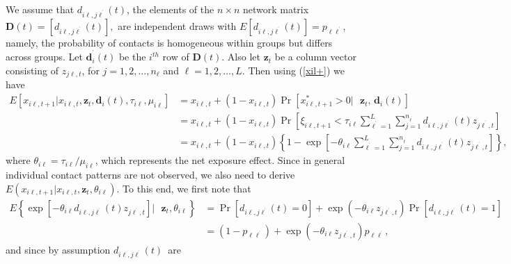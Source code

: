\documentclass[12pt]{article}
\begin{document}
We assume that $d_{i\ell,j\ell^{^{\prime}}}\left(  t\right)  $, the elements
of the $n\times n$ network matrix $\mathbf{D}\left(  t\right)  =\left[
d_{i\ell,j\ell^{^{\prime}}}\left(  t\right)  \right]  ,$ are independent draws
with $E\left[  d_{i\ell,j\ell^{^{\prime}}}\left(  t\right)  \right]
=p_{\ell\ell^{^{\prime}}}$, namely, the probability of contacts is homogeneous
within groups but differs across groups. Let $\boldsymbol{d}_{i}^{^{\prime}%
}\left(  t\right)  $ be the $i^{th}$ row of $\mathbf{D}\left(  t\right)  $.
Also let $\mathbf{z}_{t}$ be a column vector consisting of $z_{j\ell,t}$, for
$j=1,2,\ldots,n_{\ell}$ and $\ell=1,2,\ldots,L$. Then using (\ref{xil+}) we
have
\begin{align*}
E\left[  x_{i\ell,t+1}|x_{i\ell,t},\mathbf{z}_{t},\boldsymbol{d}_{i}\left(
t\right)  ,\tau_{i\ell},\mu_{i\ell}\right]   &  =x_{i\ell,t}+\left(
1-x_{i\ell,t}\right)  \Pr\left[  x_{i\ell,t+1}^{\ast}>0|\text{ }\mathbf{z}%
_{t}\text{, }\boldsymbol{d}_{i}\left(  t\right)  \right] \\
&  =x_{i\ell,t}+\left(  1-x_{i\ell,t}\right)  \Pr\left[  \xi_{i\ell,t+1}%
<\tau_{i\ell}\sum_{\ell^{^{\prime}}=1}^{L}\sum_{j=1}^{n_{\ell^{^{\prime}}}%
}d_{i\ell,j\ell^{^{\prime}}}\left(  t\right)  z_{j\ell^{^{\prime}},t}\right]
\\
&  =x_{i\ell,t}+\left(  1-x_{i\ell,t}\right)  \left\{  1-\exp\left[
-\theta_{i\ell}\sum_{\ell^{^{\prime}}=1}^{L}\sum_{j=1}^{n_{\ell^{^{\prime}}}%
}d_{i\ell,j\ell^{^{\prime}}}\left(  t\right)  z_{j\ell^{^{\prime}},t}\right]
\right\}  ,
\end{align*}
where $\theta_{i\ell}=\tau_{i\ell}/\mu_{i\ell}$, which represents the net
exposure effect. Since in general individual contact patterns are not
observed, we also need to derive $E\left(  x_{i\ell,t+1}|x_{i\ell
,t},\mathbf{z}_{t},\theta_{i\ell}\right)  $. To this end, we first note that%
\begin{align*}
E\left\{  \exp\left[  -\theta_{i\ell}d_{i\ell,j\ell^{^{\prime}}}\left(
t\right)  z_{j\ell^{^{\prime}},t}\right]  |\text{ }\mathbf{z}_{t}%
,\theta_{i\ell}\right\}   &  =\Pr\left[  d_{i\ell,j\ell^{^{\prime}}}\left(
t\right)  =0\right]  +\exp\left(  -\theta_{i\ell}z_{j\ell^{^{\prime}}%
,t}\right)  \Pr\left[  d_{i\ell,j\ell^{^{\prime}}}\left(  t\right)  =1\right]
\\
&  =\left(  1-p_{\ell\ell^{^{\prime}}}\right)  +\exp\left(  -\theta_{i\ell
}z_{j\ell^{^{\prime}},t}\right)  p_{\ell\ell^{^{\prime}}},
\end{align*}
and since by assumption $d_{i\ell,j\ell^{^{\prime}}}\left(  t\right)  $\ are
\end{document}
